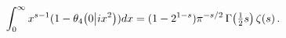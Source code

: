 \[\int_{0}^{\infty}x^{s-1}(1-\mathop{\theta_{4}\/}\nolimits\!\left(0\middle|ix^{%
2}\right))dx=(1-2^{1-s})\pi^{-s/2}\mathop{\Gamma\/}\nolimits\!\left(\tfrac{1}{%
2}s\right)\mathop{\zeta\/}\nolimits\!\left(s\right).\]